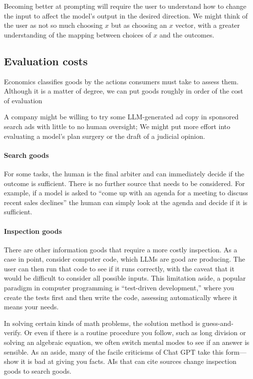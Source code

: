 \documentclass{article}
\begin{document}
Becoming better at prompting will require the user to understand how to change the input to affect the model's output in the desired direction. 
We might think of the user as not so much choosing $x$ but as choosing an $x$ vector, with a greater understanding of the mapping between choices of $x$ and the outcomes.

\subsection{Evaluation costs}
Economics classifies goods by the actions consumers must take to assess them. 
Although it is a matter of degree, we can put goods roughly in order of the cost of evaluation

A company might be willing to try some LLM-generated ad copy in sponsored search ads with little to no human oversight; 
We might put more effort into evaluating a model's plan surgery or the draft of a judicial opinion.

\paragraph{Search goods}
For some tasks, the human is the final arbiter and can immediately decide if the outcome is sufficient.
There is no further source that needs to be considered.
For example, if a model is asked to ``come up with an agenda for a meeting to discuss recent sales declines'' the human can simply look at the agenda and decide if it is sufficient. 

\paragraph{Inspection goods}
There are other information goods that require a more costly inspection. 
As a case in point, consider computer code, which LLMs are good are producing. 
The user can then run that code to see if it runs correctly, with the caveat that it would be difficult to consider all possible inputs. 
This limitation aside, a popular paradigm in computer programming is ``test-driven development,'' where you create the tests first and then write the code, assessing automatically where it means your needs.

In solving certain kinds of math problems, the solution method is guess-and-verify. 
Or even if there is a routine procedure you follow, such as long division or solving an algebraic equation, we often switch mental modes to see if an answer is sensible. 
As an aside, many of the facile criticisms of Chat GPT take this form---show it is bad at giving you facts.  
AIs that can cite sources change inspection goods to search goods. 
\end{document}

